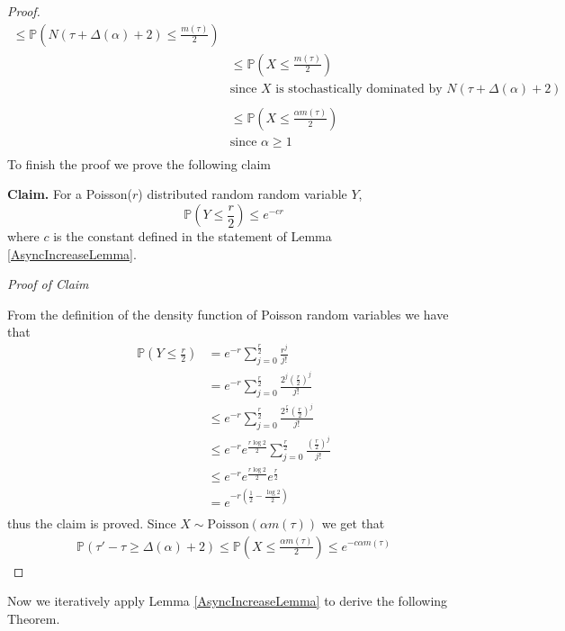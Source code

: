 \begin{proof}
\begin{align*}
		\leq \mathbb{P}\left(N(\tau + \Delta(\alpha) + 2) \leq \frac{m(\tau)}{2}\right) \\
		& \leq \mathbb{P}\left(X \leq \frac{m(\tau)}{2}\right) \\
		& \text{since } X \text{ is stochastically dominated by } N(\tau + \Delta(\alpha) + 2) \\
		& \\
		& \leq \mathbb{P}\left(X \leq \frac{\alpha m(\tau)}{2}\right) \\
		& \text{since } \alpha \geq 1 \\ %
	\end{align*}
	To finish the proof we prove the following claim

	\noindent
	\textbf{Claim.} For a Poisson($r$) distributed random random variable $Y$, 
	$$
		\mathbb{P}(Y \leq \frac{r}{2}) \leq e^{-cr}
	$$
	where $c$ is the constant defined in the statement of Lemma \ref{AsyncIncreaseLemma}.

	\noindent
	\textit{Proof of Claim}

	\noindent
	From the definition of the density function of Poisson random variables we have that 
	\begin{align*}
		\mathbb{P}(Y \leq \frac{r}{2}) & = e^{-r} \sum_{j=0}^\frac{r}{2} \frac{r^j}{j!} \\ %
		& = e^{-r} \sum_{j=0}^\frac{r}{2} \frac{2^j(\frac{r}{2})^j}{j!} \\
		& \leq e^{-r} \sum_{j=0}^\frac{r}{2} \frac{2^\frac{r}{2}(\frac{r}{2})^j}{j!} \\
		& \leq e^{-r} e^\frac{r \log 2}{2} \sum_{j=0}^\frac{r}{2} \frac{(\frac{r}{2})^j}{j!} \\
		& \leq e^{-r} e^\frac{r \log 2}{2} e^\frac{r}{2} \\
		& = e^{-r(\frac{1}{2} - \frac{\log2}{2})} \\ %
	\end{align*}
	thus the claim is proved. Since $X \sim \text{Poisson}(\alpha m(\tau))$ we get that
	\begin{align*}
		\mathbb{P}(\tau' - \tau \geq \Delta(\alpha) + 2) \leq \mathbb{P}(X \leq \frac{\alpha m(\tau)}{2}) \leq e^{-c \alpha m(\tau)}
	\end{align*}	
\end{proof}

Now we iteratively apply Lemma \ref{AsyncIncreaseLemma} to derive the following Theorem.

